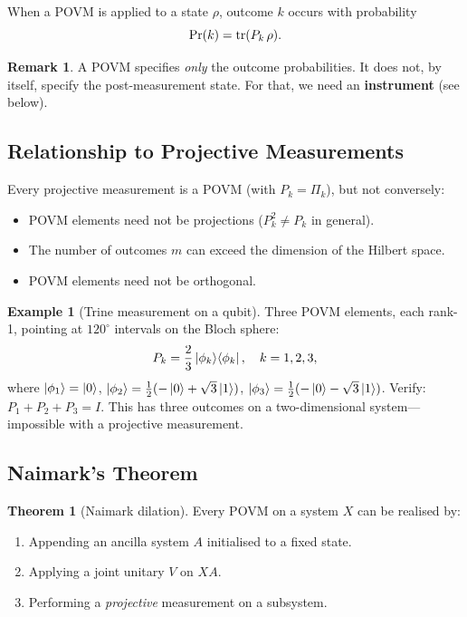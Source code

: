 \documentclass[11pt]{article}
\theoremstyle{definition}
\newtheorem{example}{Example}[section]
\newtheorem{remark}{Remark}[section]
\newtheorem{theorem}{Theorem}[section]
\begin{document}
When a POVM is applied to a state $\rho$, outcome $k$ occurs with probability
\[
    \Pr(k) = \tr(P_k\,\rho).
\]

\begin{remark}
A POVM specifies \emph{only} the outcome probabilities.  It does not, by itself, specify the post-measurement state.  For that, we need an \textbf{instrument} (see below).
\end{remark}

\subsection{Relationship to Projective Measurements}

Every projective measurement is a POVM (with $P_k=\Pi_k$), but not conversely:
\begin{itemize}
    \item POVM elements need not be projections ($P_k^2\neq P_k$ in general).
    \item The number of outcomes $m$ can exceed the dimension of the Hilbert space.
    \item POVM elements need not be orthogonal.
\end{itemize}

\begin{example}[Trine measurement on a qubit]
Three POVM elements, each rank-1, pointing at $120^\circ$ intervals on the Bloch sphere:
\[
    P_k = \frac{2}{3}\ket{\phi_k}\!\bra{\phi_k},\quad k=1,2,3,
\]
where $\ket{\phi_1}=\ket{0}$, $\ket{\phi_2}=\frac{1}{2}(-\ket{0}+\sqrt{3}\ket{1})$, $\ket{\phi_3}=\frac{1}{2}(-\ket{0}-\sqrt{3}\ket{1})$.
Verify: $P_1+P_2+P_3=I$.  This has three outcomes on a two-dimensional system---impossible with a projective measurement.
\end{example}

\subsection{Naimark's Theorem}

\begin{theorem}[Naimark dilation]
Every POVM on a system $X$ can be realised by:
\begin{enumerate}
    \item Appending an ancilla system $A$ initialised to a fixed state.
    \item Applying a joint unitary $V$ on $XA$.
    \item Performing a \emph{projective} measurement on a subsystem.
\end{enumerate}
\end{theorem}
\end{document}
